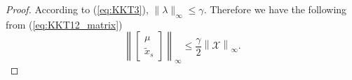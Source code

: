 \documentclass[journal]{IEEEtran}
\newcommand{\Nc}{{\mathcal{N}}}
\newcommand{\Xc}{{\mathcal{X}}}
\newtheorem*{proof}{\textbf{Proof}}
\begin{document}
\begin{proof}
		
		According to (\ref{eq:KKT3}), $\|\lambda\|_\infty \leq \gamma$. 
		Therefore we have the following from (\ref{eq:KKT12_matrix})
		\begin{equation}\label{eq:mu_xs_bounded}
			\left\|\begin{bmatrix}
				\mu \\ \tilde{x}_s 
			\end{bmatrix}\right\|_\infty
			\leq \frac{\gamma}{2}
			\left\|\Xc\right\|_\infty.
		\end{equation}
		

\end{proof}
\end{document}

